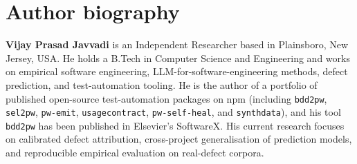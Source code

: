 \documentclass[preprint,12pt]{elsarticle}
\begin{document}
\section*{Author biography}
\noindent\textbf{Vijay Prasad Javvadi} is an Independent Researcher
based in Plainsboro, New Jersey, USA. He holds a B.Tech in Computer
Science and Engineering and works on empirical software engineering,
LLM-for-software-engineering methods, defect prediction, and
test-automation tooling. He is the author of a portfolio of published
open-source test-automation packages on npm (including
\texttt{bdd2pw}, \texttt{sel2pw}, \texttt{pw-emit},
\texttt{usagecontract}, \texttt{pw-self-heal}, and \texttt{synthdata}),
and his tool \texttt{bdd2pw} has been published in Elsevier's
SoftwareX. His current research focuses on calibrated defect
attribution, cross-project generalisation of prediction models, and
reproducible empirical evaluation on real-defect corpora.



\end{document}
